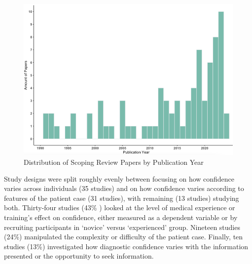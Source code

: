 \documentclass[a4paper, nobind]{templates/ociamthesis}
\begin{document}
\begin{figure}[H]

{\centering \includegraphics[width=1\linewidth]{./assets/ReviewYears} 

}

\caption[Scoping Review: Paper Distribution by Publication Year]{Distribution of Scoping Review Papers by Publication Year}\label{fig:reviewyears}
\end{figure}

\hfill\break
Study designs were split roughly evenly between focusing on how confidence varies across individuals (35 studies) and on how confidence varies according to features of the patient case (31 studies), with remaining (13 studies) studying both. Thirty-four studies (43\% ) looked at the level of medical experience or training's effect on confidence, either measured as a dependent variable or by recruiting participants in `novice' versus `experienced' group. Nineteen studies (24\%) manipulated the complexity or difficulty of the patient case. Finally, ten studies (13\%) investigated how diagnostic confidence varies with the information presented or the opportunity to seek information.
\end{document}
